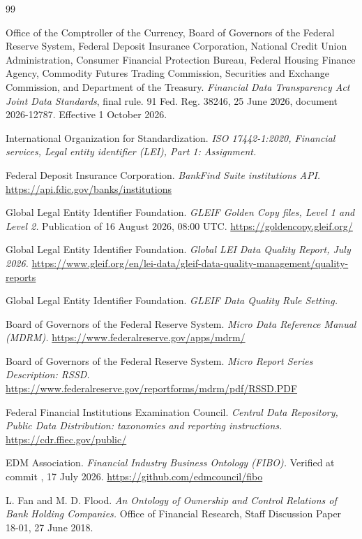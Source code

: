 \documentclass[11pt]{article}
\begin{document}
\begin{thebibliography}{99}

Office of the Comptroller of the Currency, Board of Governors of the Federal Reserve System, Federal Deposit Insurance Corporation, National Credit Union Administration, Consumer Financial Protection Bureau, Federal Housing Finance Agency, Commodity Futures Trading Commission, Securities and Exchange Commission, and Department of the Treasury.
\emph{Financial Data Transparency Act Joint Data Standards}, final rule.
91 Fed. Reg. 38246, 25 June 2026, document 2026-12787. Effective 1 October 2026.

International Organization for Standardization.
\emph{ISO 17442-1:2020, Financial services, Legal entity identifier (LEI), Part 1: Assignment.}

Federal Deposit Insurance Corporation.
\emph{BankFind Suite institutions API.}
\url{https://api.fdic.gov/banks/institutions}

Global Legal Entity Identifier Foundation.
\emph{GLEIF Golden Copy files, Level 1 and Level 2.}
Publication of 16 August 2026, 08:00 UTC.
\url{https://goldencopy.gleif.org/}

Global Legal Entity Identifier Foundation.
\emph{Global LEI Data Quality Report, July 2026.}
\url{https://www.gleif.org/en/lei-data/gleif-data-quality-management/quality-reports}

Global Legal Entity Identifier Foundation.
\emph{GLEIF Data Quality Rule Setting.}

Board of Governors of the Federal Reserve System.
\emph{Micro Data Reference Manual (MDRM).}
\url{https://www.federalreserve.gov/apps/mdrm/}

Board of Governors of the Federal Reserve System.
\emph{Micro Report Series Description: RSSD.}
\url{https://www.federalreserve.gov/reportforms/mdrm/pdf/RSSD.PDF}

Federal Financial Institutions Examination Council.
\emph{Central Data Repository, Public Data Distribution: taxonomies and reporting instructions.}
\url{https://cdr.ffiec.gov/public/}

EDM Association.
\emph{Financial Industry Business Ontology (FIBO).}
Verified at commit , 17 July 2026.
\url{https://github.com/edmcouncil/fibo}

L. Fan and M. D. Flood.
\emph{An Ontology of Ownership and Control Relations of Bank Holding Companies.}
Office of Financial Research, Staff Discussion Paper 18-01, 27 June 2018.


\end{thebibliography}
\end{document}
